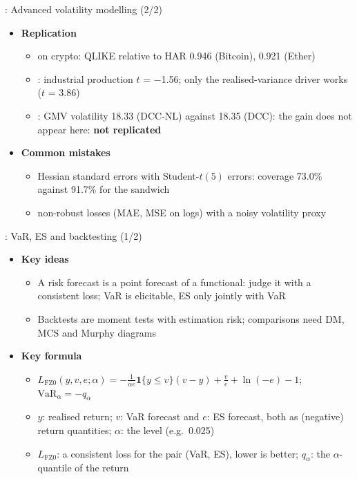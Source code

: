 \begin{frame}{: Advanced volatility modelling (2/2)}
\itemsize{\small}
\begin{itemize}
    \item \textbf{Replication}
    \begin{itemize}
        \item {} on crypto: QLIKE relative to HAR 0.946 (Bitcoin), 0.921 (Ether)
        \item {}: industrial production $t$ = \ensuremath{-}1.56; only the realised-variance driver works ($t$ = 3.86)
        \item {}: GMV volatility 18.33 (DCC-NL) against 18.35 (DCC): the gain does not appear here: \textbf{not replicated}
    \end{itemize}
    \item \textbf{Common mistakes}
    \begin{itemize}
        \item Hessian standard errors with Student-$t(5)$ errors: coverage 73.0\% against 91.7\% for the sandwich
        \item non-robust losses (MAE, MSE on logs) with a noisy volatility proxy
    \end{itemize}
\end{itemize}
\end{frame}

\begin{frame}{: VaR, ES and backtesting (1/2)}
\itemsize{\footnotesize}
\begin{itemize}
    \item \textbf{Key ideas}
    \begin{itemize}
        \item A risk forecast is a point forecast of a functional: judge it with a consistent loss; VaR is elicitable, ES only jointly with VaR
        \item Backtests are moment tests with estimation risk; comparisons need DM, MCS and Murphy diagrams
    \end{itemize}
    \item \textbf{Key formula}
    \begin{itemize}
        \item $L_{\mathrm{FZ0}}(y, v, e; \alpha) = -\frac{1}{\alpha e}\mathbf 1\{y \le v\}(v - y) + \frac{v}{e} + \ln(-e) - 1$; $\mathrm{VaR}_\alpha = -q_\alpha$
        \item $y$: realised return; $v$: VaR forecast and $e$: ES forecast, both as (negative) return quantities; $\alpha$: the level (e.g.\ 0.025)
        \item $L_{\mathrm{FZ0}}$: a consistent loss for the pair (VaR, ES), lower is better; $q_\alpha$: the $\alpha$-quantile of the return
    \end{itemize}
\end{itemize}
\end{frame}

